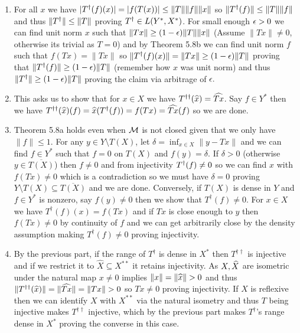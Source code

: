 \documentclass[12pt,a4paper]{article}
\begin{document}
\begin{solution}
\begin{enumerate}[label=\alph*.]
    \item For all $x$ we have $|T^\dagger(f)(x)|=|f(T(x))|\leq\|T\|\|f\|\|x\|$ so $\|T^\dagger(f)\|\leq\|T\|\|f\|$ and thus $\|T^\dagger\|\leq\|T\|$ proving $T^\dagger\in L(Y^*,X^*)$.  
        For small enough $\epsilon>0$ we can find unit norm $x$ such that $\|Tx\|\geq(1-\epsilon)\|T\|\|x\|$ (Assume $\|Tx\|\neq 0$, otherwise its trivial as $T=0$) and by Theorem 5.8b we can find unit norm $f$ such that $f(Tx)=\|Tx\|$ so $\|T^\dagger(f)(x)\|=\|Tx\|\geq(1-\epsilon)\|T\|$ proving that $\|T^\dagger(f)\|\geq(1-\epsilon)\|T\|$ (remember how $x$ was unit norm) and thus $\|T^\dagger\|\geq(1-\epsilon)\|T\|$ proving the claim via arbitrage of $\epsilon.$ 
    \item This asks us to show that for $x\in X$ we have $T^{\dagger\dagger}(\widehat{x})=\widehat{Tx}$. 
        Say $f\in Y^*$ then we have $T^{\dagger\dagger}(\widehat{x})(f)=\widehat{x}(T^\dagger(f))=f(Tx)=\widehat{Tx}(f)$ so we are done. 
    \item Theorem 5.8a holds even when $\mathcal{M}$ is not closed given that we only have $\|f\|\leq 1$. 
        For any $y\in Y\setminus T(X)$, let $\delta=\inf_{x\in X}\|y-Tx\|$ and we can find $f\in Y^*$ such that $f=0$ on $T(X)$ and $f(y)=\delta$. 
        If $\delta>0$ (otherwise $y\in \overline{T(X)}$) then $f\neq 0$ and from injectivity $T^\dagger(f)\neq 0$ so we can find $x$ with $f(Tx)\neq 0$ which is a contradiction so we must have $\delta=0$ proving $Y\setminus T(X) \subseteq \overline{T(X)}$ and we are done.  
        Conversely, if $T(X)$ is dense in $Y$ and $f\in Y^*$ is nonzero, say $f(y)\neq 0$ then we show that $T^\dag(f)\neq 0$. 
        For $x\in X$ we have $T^\dag(f)(x)=f(Tx)$ and if $Tx$ is close enough to $y$ then $f(Tx)\neq 0$ by continuity of $f$ and we can get arbitrarily close by the density assumption making $T^\dag(f)\neq 0$ proving injectivity. 
    \item By the previous part, if the range of $T^\dag$ is dense in $X^*$ then $T^{\dag\dag}$ is injective and if we restrict it to $\widehat{X} \subseteq X^{**}$ it retains injectivity. As $X,\widehat{X}$ are isometric under the natural map $x\neq 0$ implies $\|x\|=\|\hh{x}\|>0$ and thus $\|T^{\dag\dag}(\hh{x})\|=\|\hh{Tx}\|=\|Tx\|>0$ so  $Tx\neq 0$ proving injectivity. 
        If $X$ is reflexive then we can identify $X$ with $X^{**}$ via the natural isometry and thus $T$ being injective makes $T^{\dag\dag}$ injective, which by the previous part makes $T^\dag$'s range dense in $X^*$ proving the converse in this case.   
\end{enumerate}
\end{solution}
\end{document}
